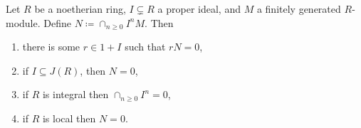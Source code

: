 Let $R$ be a noetherian ring, $I \subsetneq R$ a proper ideal, and $M$ a finitely generated
$R$-module. Define $N\coloneqq \cap_{n\geq 0} I^nM$. Then
\begin{enumerate}[label=(\roman*)]
	\item there is some $r \in 1+I$ such that $rN = 0$,
	\item if $I \subseteq J(R)$, then $N = 0$,
	\item if $R$ is integral then $\cap_{n\geq 0}I^n = 0$,
	\item if $R$ is local then $N = 0$.
\end{enumerate}

